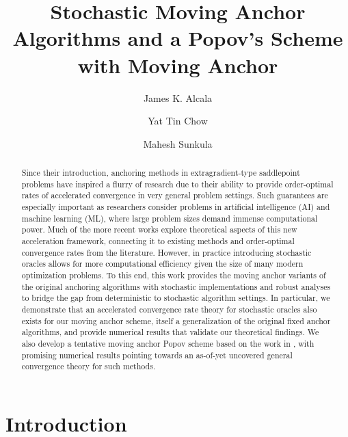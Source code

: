 \documentclass[11pt,reqno,oneside]{amsart}
\title{Stochastic Moving Anchor Algorithms and a Popov's Scheme with Moving Anchor}
\author{James K. Alcala}
\author{Yat Tin Chow}
\author{Mahesh Sunkula}
\theoremstyle{definition}
\numberwithin{equation}{section}
\begin{document}
\maketitle
\begin{abstract}
    Since their introduction, anchoring methods in extragradient-type saddlepoint problems have inspired a flurry of research due to their ability to provide order-optimal rates of accelerated convergence in very general problem settings. Such guarantees are especially important as researchers consider problems in artificial intelligence (AI) and machine learning (ML), where large problem sizes demand immense computational power. Much of the more recent works explore theoretical aspects of this new acceleration framework, connecting it to existing methods and order-optimal convergence rates from the literature. However, in practice introducing stochastic oracles allows for more computational efficiency given the size of many modern optimization problems. To this end, this work provides the moving anchor variants \cite{alcala2023moving} of the original anchoring algorithms \cite{yoon_ryu} with stochastic implementations and robust analyses to bridge the gap from deterministic to stochastic algorithm settings. In particular, we demonstrate that an accelerated convergence rate theory for stochastic oracles also exists for our moving anchor scheme, itself a generalization of the original fixed anchor algorithms, and provide numerical results that validate our theoretical findings. We also develop a tentative moving anchor Popov scheme based on the work in \cite{tran2021halpern}, with promising numerical results pointing towards an as-of-yet uncovered general convergence theory for such methods.
\end{abstract}

\section{Introduction}
\end{document}
